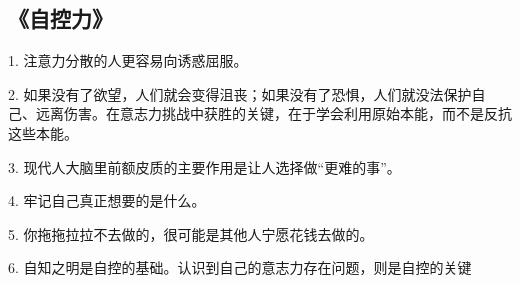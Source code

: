 \subsection{《自控力》}
1. 注意力分散的人更容易向诱惑屈服。

2. 如果没有了欲望，人们就会变得沮丧；如果没有了恐惧，人们就没法保护自己、远离伤害。在意志力挑战中获胜的关键，在于学会利用原始本能，而不是反抗这些本能。

3. 现代人大脑里前额皮质的主要作用是让人选择做“更难的事”。

4. 牢记自己真正想要的是什么。

5. 你拖拖拉拉不去做的，很可能是其他人宁愿花钱去做的。

6. 自知之明是自控的基础。认识到自己的意志力存在问题，则是自控的关键